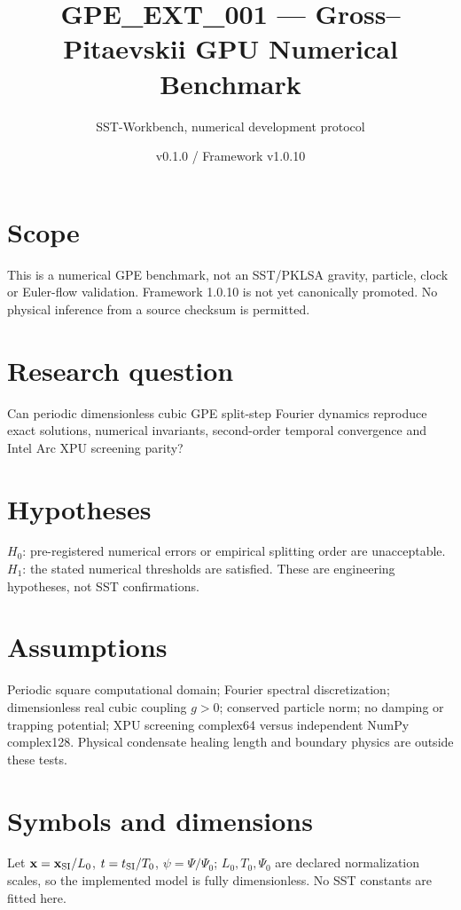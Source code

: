 \documentclass[11pt,a4paper]{article}
\title{GPE\_EXT\_001 --- Gross--Pitaevskii GPU Numerical Benchmark}
\author{SST-Workbench, numerical development protocol}
\date{v0.1.0 / Framework v1.0.10}
\begin{document}
\maketitle
\section{Scope}
This is a numerical GPE benchmark, not an SST/PKLSA gravity, particle, clock or Euler-flow validation. Framework 1.0.10 is not yet canonically promoted. No physical inference from a source checksum is permitted.
\section{Research question}
Can periodic dimensionless cubic GPE split-step Fourier dynamics reproduce exact solutions, numerical invariants, second-order temporal convergence and Intel Arc XPU screening parity?
\section{Hypotheses}
$H_0$: pre-registered numerical errors or empirical splitting order are unacceptable. $H_1$: the stated numerical thresholds are satisfied. These are engineering hypotheses, not SST confirmations.
\section{Assumptions}
Periodic square computational domain; Fourier spectral discretization; dimensionless real cubic coupling $g>0$; conserved particle norm; no damping or trapping potential; XPU screening complex64 versus independent NumPy complex128. Physical condensate healing length and boundary physics are outside these tests.
\section{Symbols and dimensions}
Let $\mathbf{x}=\mathbf{x}_{\rm SI}/L_0$, $t=t_{\rm SI}/T_0$, $\psi=\Psi/\Psi_0$; $L_0,T_0,\Psi_0$ are declared normalization scales, so the implemented model is fully dimensionless. No SST constants are fitted here.
\end{document}
